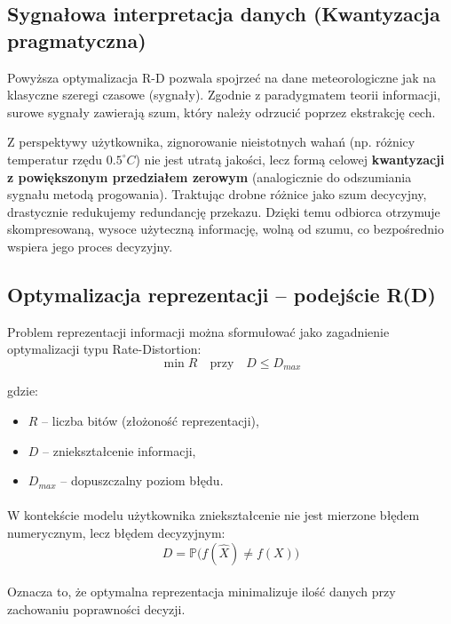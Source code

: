 \documentclass[a4paper,12pt]{article}
\begin{document}
\subsection{Sygnałowa interpretacja danych (Kwantyzacja pragmatyczna)}

Powyższa optymalizacja R-D pozwala spojrzeć na dane meteorologiczne jak na klasyczne szeregi czasowe (sygnały). Zgodnie z paradygmatem teorii informacji, surowe sygnały zawierają szum, który należy odrzucić poprzez ekstrakcję cech. 

Z perspektywy użytkownika, zignorowanie nieistotnych wahań (np. różnicy temperatur rzędu $0.5^\circ C$) nie jest utratą jakości, lecz formą celowej \textbf{kwantyzacji z powiększonym przedziałem zerowym} (analogicznie do odszumiania sygnału metodą progowania). Traktując drobne różnice jako szum decycyjny, drastycznie redukujemy redundancję przekazu. Dzięki temu odbiorca otrzymuje skompresowaną, wysoce użyteczną informację, wolną od szumu, co bezpośrednio wspiera jego proces decyzyjny.
\subsection{Optymalizacja reprezentacji – podejście R(D)}

Problem reprezentacji informacji można sformułować jako zagadnienie
optymalizacji typu Rate-Distortion:
\[
\min R \quad \text{przy} \quad D \leq D_{max}
\]

gdzie:
\begin{itemize}
    \item $R$ – liczba bitów (złożoność reprezentacji),
    \item $D$ – zniekształcenie informacji,
    \item $D_{max}$ – dopuszczalny poziom błędu.
\end{itemize}

\paragraph{}
W kontekście modelu użytkownika zniekształcenie nie jest mierzone błędem
numerycznym, lecz błędem decyzyjnym:
\[
D = \mathbb{P}\big(f(\hat{X}) \neq f(X)\big)
\]

\paragraph{}
Oznacza to, że optymalna reprezentacja minimalizuje ilość danych przy zachowaniu
poprawności decyzji.
\end{document}
